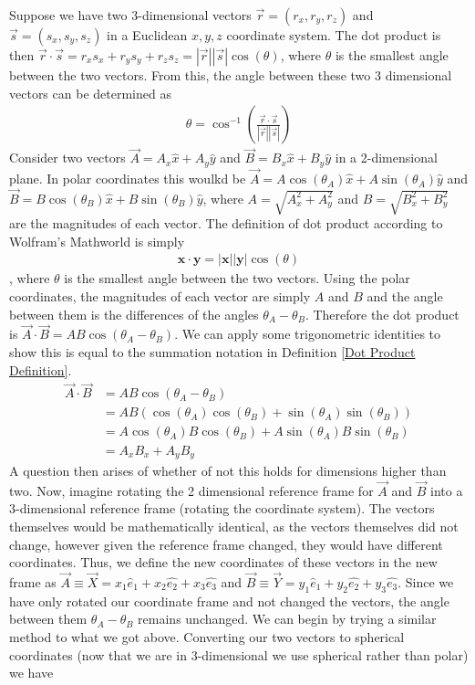 Suppose we have two 3-dimensional vectors $\vec{r} = (r_x,r_y,r_z)$ and $\vec{s}=(s_x,s_y,s_z)$ in a Euclidean $x,y,z$ coordinate system. The dot product is then $\vec{r} \cdot \vec{s} = r_xs_x+r_ys_y+r_zs_z = |\vec{r}||\vec{s}|\cos(\theta)$, where $\theta$ is the smallest angle between the two vectors. From this, the angle between these two 3 dimensional vectors can be determined as 
\begin{align}
	\theta = \cos^{-1}\left(\frac{\vec{r} \cdot \vec{s}}{|\vec{r}||\vec{s}|}\right)
\end{align}
Consider two vectors $\vec{A}=A_x\hat{x}+A_y\hat{y}$ and $\vec{B}=B_x\hat{x}+B_y\hat{y}$ in a 2-dimensional plane. In polar coordinates this woulkd be $\vec{A}=A\cos(\theta_A)\hat{x}+A\sin(\theta_A)\hat{y}$ and $\vec{B}=B\cos(\theta_B)\hat{x}+B\sin(\theta_B)\hat{y}$, where $A=\sqrt{A_x^2+A_y^2}$ and $B=\sqrt{B_x^2+B_y^2}$ are the magnitudes of each vector. The definition of dot product according to Wolfram's Mathworld is simply 
\begin{align}
	\mathbf{x}\cdot\mathbf{y} = |\mathbf{x}||\mathbf{y}|\cos(\theta) \label{defn:Wolframs Dot Prodcut Definition}
\end{align}, where $\theta$ is the smallest angle between the two vectors. Using the polar coordinates, the magnitudes of each vector are simply $A$ and $B$ and the angle between them is the differences of the angles $\theta_A-\theta_B$. Therefore the dot product is $\vec{A}\cdot\vec{B} = AB\cos(\theta_A-\theta_B)$. We can apply some trigonometric identities to show this is equal to the summation notation in Definition \ref{Dot Product Definition}.
\begin{align}
	\vec{A}\cdot\vec{B} &= AB\cos(\theta_A-\theta_B) \label{eqn:polar coordinate dot product}\\
	&= AB(\cos(\theta_A)\cos(\theta_B)+\sin(\theta_A)\sin(\theta_B)) \\
	&= A\cos(\theta_A)B\cos(\theta_B)+A\sin(\theta_A)B\sin(\theta_B) \\
	&= A_xB_x+A_yB_y
\end{align}
A question then arises of whether of not this holds for dimensions higher than two. Now, imagine rotating the 2 dimensional reference frame for $\vec{A}$ and $\vec{B}$ into a 3-dimensional reference frame (rotating the coordinate system). The vectors themselves would be mathematically identical, as the vectors themselves did not change, however given the reference frame changed, they would have different coordinates. Thus, we define the new coordinates of these vectors in the new frame as $\vec{A}\equiv \vec{X} =x_1\hat{e}_1 + x_2\hat{e_2}+x_3\hat{e_3}$ and $\vec{B}\equiv \vec{Y} =y_1\hat{e}_1 + y_2\hat{e_2}+y_3\hat{e_3}$. Since we have only rotated our coordinate frame and not changed the vectors, the angle between them $\theta_A-\theta_B$ remains unchanged. We can begin by trying a similar method to what we got above. Converting our two vectors to spherical coordinates (now that we are in 3-dimensional we use spherical rather than polar) we have
